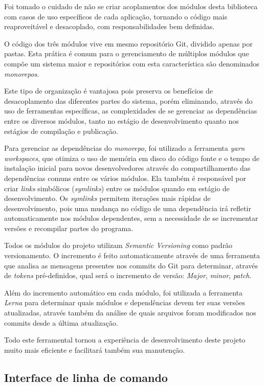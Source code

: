 \documentclass[twosideprint]{politex}
\begin{document}
Foi tomado o cuidado de não se criar acoplamentos dos módulos desta biblioteca com casos de uso específicos de cada aplicação, tornando o código mais reaproveitável e desacoplado, com responsabilidades bem definidas.

O código dos três módulos vive em mesmo repositório Git, dividido apenas por pastas. Esta prática é comum para o gerenciamento de múltiplos módulos que compõe um sistema maior e  repositórios com esta característica são denominados \textit{monorepos}.

Este tipo de organização é vantajosa pois preserva os benefícios de desacoplamento das diferentes partes do sistema, porém eliminando, através do uso de ferramentas específicas, as complexidades de se gerenciar as dependências entre os diversos módulos, tanto no estágio de desenvolvimento quanto nos estágios de compilação e publicação.

Para gerenciar as dependências do \textit{monorepo}, foi utilizado a ferramenta \textit{yarn workspaces}, que otimiza o uso de memória em disco do código fonte e o tempo de instalação inicial para novos desenvolvedores através do compartilhamento das dependências comuns entre os vários módulos. Ela também é responsável por criar \textit{links} simbólicos (\textit{symlinks}) entre os módulos quando em estágio de desenvolvimento. Os \textit{symlinks} permitem iterações mais rápidas de desenvolvimento, pois uma mudança no código de uma dependência irá refletir automaticamente nos módulos dependentes, sem a necessidade de se incrementar versões e recompilar partes do programa.

Todos os módulos do projeto utilizam \textit{Semantic Versioning} como padrão versionamento. O incremento é feito automaticamente através de uma ferramenta que analisa as mensagens presentes nos commits do Git para determinar, através de \textit{tokens} pré-definidos, qual será o incremento de versão: \textit{Major}, \textit{minor}, \textit{patch}.

Além do incremento automático em cada módulo, foi utilizada a ferramenta \textit{Lerna} para determinar quais módulos e dependências devem ter suas versões atualizadas, através também da análise de quais arquivos foram modificados nos commits desde a última atualização.

Todo este ferramental tornou a experiência de desenvolvimento deste projeto muito mais eficiente e facilitará também sua manutenção.

    \subsection{Interface de linha de comando}
\end{document}
